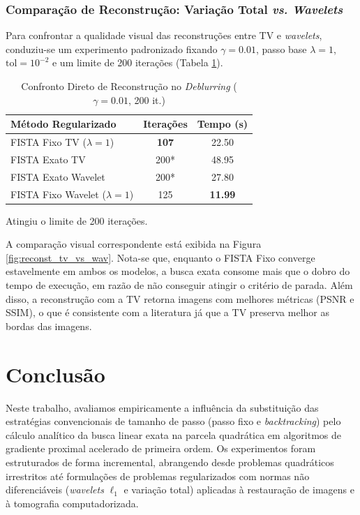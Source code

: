 \documentclass[12pt]{article}
\begin{document}
\subsubsection{Comparação de Reconstrução: Variação Total \textit{vs.} \textit{Wavelets}}

Para confrontar a qualidade visual das reconstruções entre TV e \textit{wavelets}, conduziu-se um experimento padronizado fixando $\gamma = 0.01$, passo base $\lambda = 1$, $\text{tol} = 10^{-2}$ e um limite de 200 iterações (Tabela \ref{tab:comp_tv_wav_deblur}).

\begin{table}[H]
    \centering
    \caption{Confronto Direto de Reconstrução no \textit{Deblurring} ($\gamma=0.01$, 200 it.)}
    \label{tab:comp_tv_wav_deblur}
    \begin{tabular}{lcc}
        \toprule
        \textbf{Método Regularizado} & \textbf{Iterações} & \textbf{Tempo (s)} \\
        \midrule
        FISTA Fixo TV ($\lambda=1$)      & \textbf{107} & 22.50 \\
        FISTA Exato TV                   & 200* & 48.95 \\
        FISTA Exato Wavelet              & 200* & 27.80 \\
        FISTA Fixo Wavelet ($\lambda=1$) & 125  & \textbf{11.99} \\
        \bottomrule
    \end{tabular}
    
    \vspace{0.1cm}
    {\footnotesize *Atingiu o limite de 200 iterações.}
\end{table}

A comparação visual correspondente está exibida na Figura \ref{fig:reconst_tv_vs_wav}. Nota-se que, enquanto o FISTA Fixo converge estavelmente em ambos os modelos, a busca exata consome mais que o dobro do tempo de execução, em razão de não conseguir atingir o critério de parada. Além disso, a reconstrução com a TV retorna imagens com melhores métricas (PSNR e SSIM), o que é consistente com a literatura já que a TV preserva melhor as bordas das imagens.

\section{Conclusão}

Neste trabalho, avaliamos empiricamente a influência da substituição das estratégias convencionais de tamanho de passo (passo fixo e \textit{backtracking}) pelo cálculo analítico da busca linear exata na parcela quadrática em algoritmos de gradiente proximal acelerado de primeira ordem. Os experimentos foram estruturados de forma incremental, abrangendo desde problemas quadráticos irrestritos até formulações de problemas regularizados com normas não diferenciáveis (\textit{wavelets} $\ell_1$ e variação total) aplicadas à restauração de imagens e à tomografia computadorizada.
\end{document}
